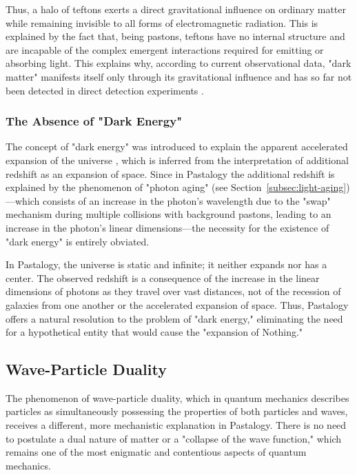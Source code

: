 \documentclass[pdflatex,sn-mathphys-num,referee]{sn-jnl}
\begin{document}
Thus, a halo of teftons exerts a direct gravitational influence on ordinary matter while remaining invisible to all forms of electromagnetic radiation. This is explained by the fact that, being pastons, teftons have no internal structure and are incapable of the complex emergent interactions required for emitting or absorbing light. This explains why, according to current observational data, "dark matter" manifests itself only through its gravitational influence and has so far not been detected in direct detection experiments \cite{bertone2005-review}.

\subsubsection{The Absence of "Dark Energy"}\label{subsubsec:no-dark-energy}

The concept of "dark energy" was introduced to explain the apparent accelerated expansion of the universe \cite{riess1998}, which is inferred from the interpretation of additional redshift as an expansion of space. Since in Pastalogy the additional redshift is explained by the phenomenon of "photon aging" (see Section~\ref{subsec:light-aging})---which consists of an increase in the photon's wavelength due to the "swap" mechanism during multiple collisions with background pastons, leading to an increase in the photon's linear dimensions---the necessity for the existence of "dark energy" is entirely obviated.

In Pastalogy, the universe is static and infinite; it neither expands nor has a center. The observed redshift is a consequence of the increase in the linear dimensions of photons as they travel over vast distances, not of the recession of galaxies from one another or the accelerated expansion of space. Thus, Pastalogy offers a natural resolution to the problem of "dark energy," eliminating the need for a hypothetical entity that would cause the "expansion of Nothing."

\subsection{Wave-Particle Duality}\label{subsec:wave-particle-duality}

The phenomenon of wave-particle duality, which in quantum mechanics describes particles as simultaneously possessing the properties of both particles and waves, receives a different, more mechanistic explanation in Pastalogy. There is no need to postulate a dual nature of matter or a "collapse of the wave function," which remains one of the most enigmatic and contentious aspects of quantum mechanics.
\end{document}
